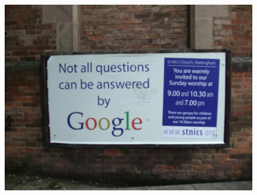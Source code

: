 \documentclass{beamer}
\begin{document}
\begin{frame}{}
  \begin{figure}
      \includegraphics[width=0.9\linewidth]{questions.jpg}
  \end{figure}
\end{frame}
\end{document}
